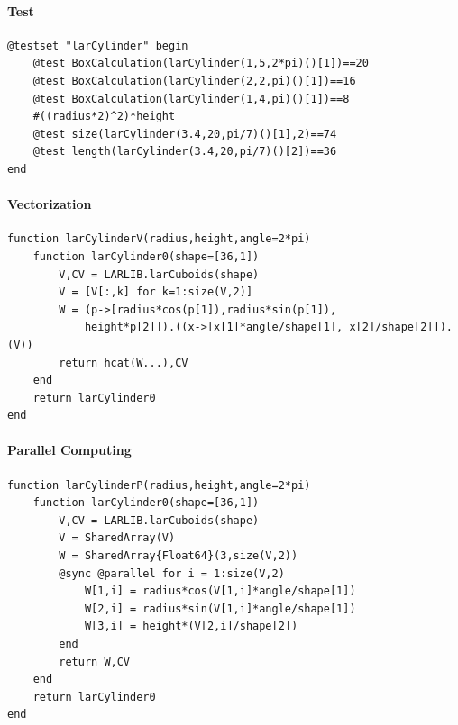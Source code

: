 \documentclass{article}
\begin{document}
\paragraph{Test}

\begin{Verbatim}
@testset "larCylinder" begin
	@test BoxCalculation(larCylinder(1,5,2*pi)()[1])==20
	@test BoxCalculation(larCylinder(2,2,pi)()[1])==16
	@test BoxCalculation(larCylinder(1,4,pi)()[1])==8
	#((radius*2)^2)*height
	@test size(larCylinder(3.4,20,pi/7)()[1],2)==74
	@test length(larCylinder(3.4,20,pi/7)()[2])==36
end
\end{Verbatim}

\paragraph{Vectorization}

\begin{verbatim}
function larCylinderV(radius,height,angle=2*pi)
    function larCylinder0(shape=[36,1])
        V,CV = LARLIB.larCuboids(shape)
        V = [V[:,k] for k=1:size(V,2)]
        W = (p->[radius*cos(p[1]),radius*sin(p[1]),
            height*p[2]]).((x->[x[1]*angle/shape[1], x[2]/shape[2]]).(V))
        return hcat(W...),CV
    end
    return larCylinder0
end
\end{verbatim}

\paragraph{Parallel Computing}
\begin{Verbatim}
function larCylinderP(radius,height,angle=2*pi)
	function larCylinder0(shape=[36,1])
		V,CV = LARLIB.larCuboids(shape)
		V = SharedArray(V)
        W = SharedArray{Float64}(3,size(V,2))
        @sync @parallel for i = 1:size(V,2)
            W[1,i] = radius*cos(V[1,i]*angle/shape[1])
            W[2,i] = radius*sin(V[1,i]*angle/shape[1])
            W[3,i] = height*(V[2,i]/shape[2])
        end
        return W,CV
    end
    return larCylinder0
end 
\end{Verbatim}
\end{document}
